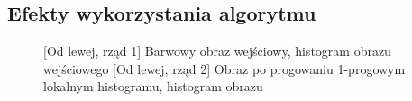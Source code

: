 \documentclass[a4paper,12pt, titlepage]{report}
\begin{document}
\subsection*{Efekty wykorzystania algorytmu}
\begin{figure}[h]
    \centering
    \qquad
    \caption{[Od lewej, rząd 1] Barwowy obraz wejściowy, histogram obrazu wejściowego [Od lewej, rząd 2] Obraz po progowaniu 1-progowym lokalnym histogramu, histogram obrazu}%
    \label{fig:geo_after_grey1}%
\end{figure}
\end{document}
